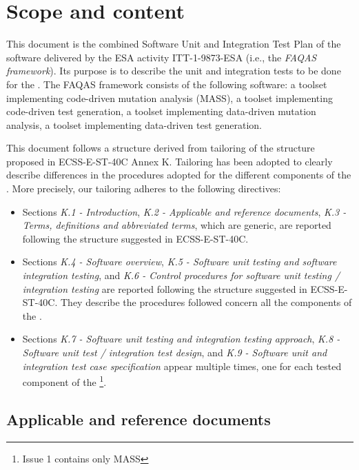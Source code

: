 
\chapter{Scope and content}

This document is the combined Software Unit and Integration Test Plan of the software delivered by the ESA activity ITT-1-9873-ESA (i.e., the \emph{FAQAS framework}). Its purpose is to describe the unit and integration tests to be done for the \FAQAS.
The FAQAS framework consists of the following software: a toolset  implementing code-driven mutation analysis (MASS), a toolset implementing code-driven test generation, a toolset implementing data-driven mutation analysis, a toolset implementing data-driven test generation.

This document follows a structure derived from tailoring of the structure proposed in ECSS-E-ST-40C Annex K. Tailoring has been adopted to clearly describe differences in the procedures adopted for the different components of the \FAQAS. More precisely, our tailoring adheres to the following directives:

\begin{itemize}
\item Sections 
\emph{K.1 - Introduction}, 
\emph{K.2 - Applicable and reference documents}, 
\emph{K.3 - Terms, definitions and abbreviated terms}, which are generic, are reported following the structure suggested in ECSS-E-ST-40C. 

\item Sections \emph{K.4 - Software overview}, \emph{K.5 - Software unit testing and software integration testing}, 
 and \emph{K.6 - Control procedures for software unit testing / integration testing} are reported following the structure suggested in ECSS-E-ST-40C. They describe the procedures followed concern all the components of the \FAQAS.
 
\item Sections \emph{K.7 - Software unit testing and integration testing approach}, \emph{K.8 - Software unit test / integration test design},
 and \emph{K.9 - Software unit and integration test case specification} appear multiple times, one for each tested component of the \FAQAS\footnote{Issue 1 contains only MASS}. 
\end{itemize}
 
\section{Applicable and reference documents}

